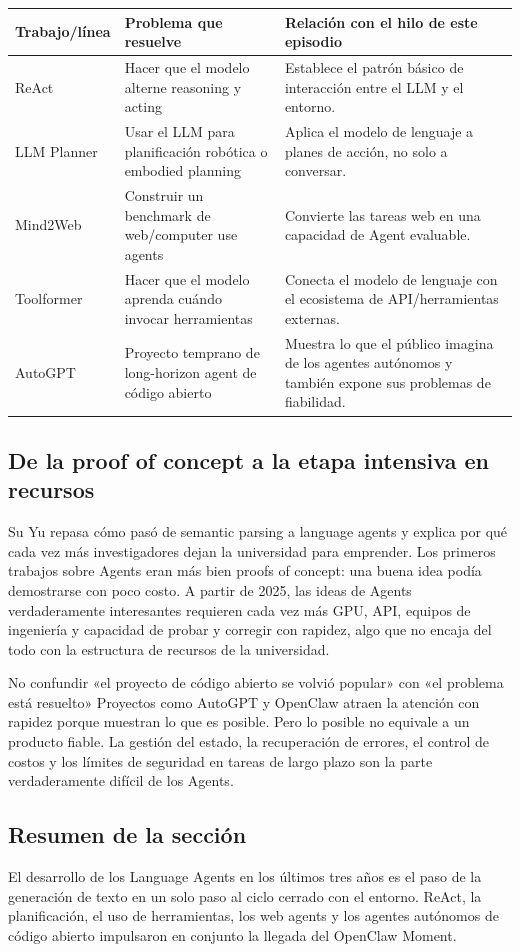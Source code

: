 \noindent\begin{tabularx}{\textwidth}{p{}p{}X}
\toprule
Trabajo/línea & Problema que resuelve & Relación con el hilo de este episodio \\
\midrule
ReAct & Hacer que el modelo alterne reasoning y acting & Establece el patrón básico de interacción entre el LLM y el entorno. \\
LLM Planner & Usar el LLM para planificación robótica o embodied planning & Aplica el modelo de lenguaje a planes de acción, no solo a conversar. \\
Mind2Web & Construir un benchmark de web/computer use agents & Convierte las tareas web en una capacidad de Agent evaluable. \\
Toolformer & Hacer que el modelo aprenda cuándo invocar herramientas & Conecta el modelo de lenguaje con el ecosistema de API/herramientas externas. \\
AutoGPT & Proyecto temprano de long-horizon agent de código abierto & Muestra lo que el público imagina de los agentes autónomos y también expone sus problemas de fiabilidad. \\
\bottomrule
\end{tabularx}

\subsection{De la proof of concept a la etapa intensiva en recursos}

Su Yu repasa cómo pasó de semantic parsing a language agents y explica por qué cada vez más investigadores dejan la universidad para emprender. Los primeros trabajos sobre Agents eran más bien proofs of concept: una buena idea podía demostrarse con poco costo. A partir de 2025, las ideas de Agents verdaderamente interesantes requieren cada vez más GPU, API, equipos de ingeniería y capacidad de probar y corregir con rapidez, algo que no encaja del todo con la estructura de recursos de la universidad.

\begin{warningbox}{No confundir «el proyecto de código abierto se volvió popular» con «el problema está resuelto»}
Proyectos como AutoGPT y OpenClaw atraen la atención con rapidez porque muestran lo que es posible. Pero lo posible no equivale a un producto fiable. La gestión del estado, la recuperación de errores, el control de costos y los límites de seguridad en tareas de largo plazo son la parte verdaderamente difícil de los Agents.
\end{warningbox}

\subsection{Resumen de la sección}

El desarrollo de los Language Agents en los últimos tres años es el paso de la generación de texto en un solo paso al ciclo cerrado con el entorno. ReAct, la planificación, el uso de herramientas, los web agents y los agentes autónomos de código abierto impulsaron en conjunto la llegada del OpenClaw Moment.
